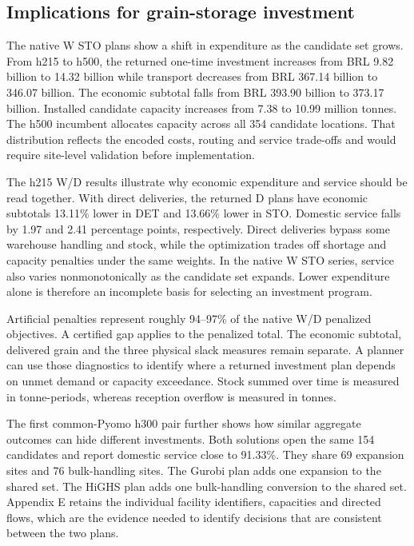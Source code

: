 \documentclass[
  english,
  11pt,
  a4paper,
  authoryear,
  preprint]{elsarticle}
\begin{document}
\subsection{Implications for grain-storage
investment}\label{implications-for-grain-storage-investment}

The native W STO plans show a shift in expenditure as the candidate set
grows. From h215 to h500, the returned one-time investment increases
from BRL 9.82 billion to 14.32 billion while transport decreases from
BRL 367.14 billion to 346.07 billion. The economic subtotal falls from
BRL 393.90 billion to 373.17 billion. Installed candidate capacity
increases from 7.38 to 10.99 million tonnes. The h500 incumbent
allocates capacity across all 354 candidate locations. That distribution
reflects the encoded costs, routing and service trade-offs and would
require site-level validation before implementation.

The h215 W/D results illustrate why economic expenditure and service
should be read together. With direct deliveries, the returned D plans
have economic subtotals 13.11\% lower in DET and 13.66\% lower in STO.
Domestic service falls by 1.97 and 2.41 percentage points, respectively.
Direct deliveries bypass some warehouse handling and stock, while the
optimization trades off shortage and capacity penalties under the same
weights. In the native W STO series, service also varies
nonmonotonically as the candidate set expands. Lower expenditure alone
is therefore an incomplete basis for selecting an investment program.

Artificial penalties represent roughly 94--97\% of the native W/D
penalized objectives. A certified gap applies to the penalized total.
The economic subtotal, delivered grain and the three physical slack
measures remain separate. A planner can use those diagnostics to
identify where a returned investment plan depends on unmet demand or
capacity exceedance. Stock summed over time is measured in
tonne-periods, whereas reception overflow is measured in tonnes.

The first common-Pyomo h300 pair further shows how similar aggregate
outcomes can hide different investments. Both solutions open the same
154 candidates and report domestic service close to 91.33\%. They share
69 expansion sites and 76 bulk-handling sites. The Gurobi plan adds one
expansion to the shared set. The HiGHS plan adds one bulk-handling
conversion to the shared set. Appendix E retains the individual facility
identifiers, capacities and directed flows, which are the evidence
needed to identify decisions that are consistent between the two plans.
\end{document}
